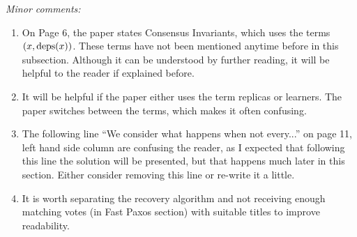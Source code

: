 \documentclass[letterpaper,twocolumn,10pt]{article}
\newenvironment{reviewerquote}
{\list{}{\leftmargin=\parindent\rightmargin=0in}\item[] \itshape \color{ReviewerDarkGray}}%
{\endlist}
\begin{document}
\begin{reviewerquote}
  Minor comments:

  \begin{enumerate}
  \item
    On Page 6, the paper states Consensus Invariants, which uses the terms $(x,
    \text{deps}(x))$. These terms have not been mentioned anytime before in this
    subsection. Although it can be understood by further reading, it will be
    helpful to the reader if explained before.
  \item
    It will be helpful if the paper either uses the term replicas or learners.
    The paper switches between the terms, which makes it often confusing.
  \item
    The following line ``We consider what happens when not every...'' on page
    11, left hand side column are confusing the reader, as I expected that
    following this line the solution will be presented, but that happens much
    later in this section. Either consider removing this line or re-write it a
    little.
  \item
    It is worth separating the recovery algorithm and not receiving enough
    matching votes (in Fast Paxos section) with suitable titles to improve
    readability.
  \end{enumerate}
\end{reviewerquote}
\end{document}
